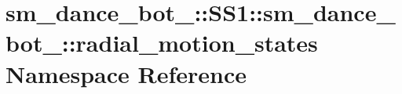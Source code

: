 \hypertarget{namespacesm__dance__bot__2_1_1SS1_1_1sm__dance__bot__2_1_1radial__motion__states}{}\section{sm\+\_\+dance\+\_\+bot\+\_\+:\+:S\+S1\+:\+:sm\+\_\+dance\+\_\+bot\+\_\+:\+:radial\+\_\+motion\+\_\+states Namespace Reference}
\label{namespacesm__dance__bot__2_1_1SS1_1_1sm__dance__bot__2_1_1radial__motion__states}
